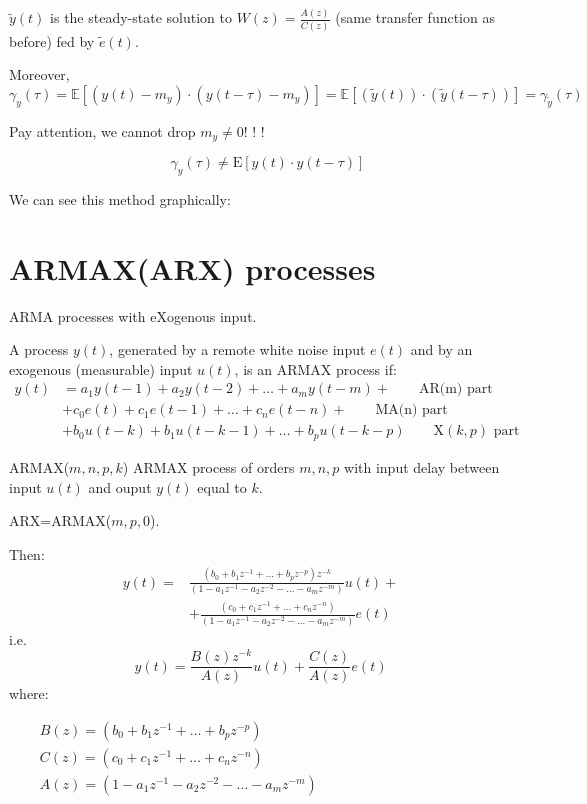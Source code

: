 $\tilde{y}(t)$ is the steady-state solution to $W(z)=\frac{A(z)}{C(z)}$ (same transfer function as before) fed by $\tilde{e}(t)$.

Moreover,
$$
\gamma_{y}(\tau)=\mathbb{E}\left[\left(y(t)-m_{y}\right) \cdot\left(y(t-\tau)-m_{y}\right)\right]=\mathbb{E}[(\tilde{y}(t)) \cdot(\tilde{y}(t-\tau))]=\gamma_{\tilde{y}}(\tau)
$$

Pay attention, we cannot drop $m_{y} \neq 0 $! ! ! 

$$\quad \gamma_{y}(\tau) \neq \mathrm{E}[y(t) \cdot y(t-\tau)]$$

We can see this method graphically:


\section{ARMAX(ARX) processes}
ARMA processes with eXogenous input.

A process $y(t)$, generated by a remote white noise input $e(t)$ and by an exogenous (measurable) input $u(t)$, is an ARMAX process if:
\begin{align*}
	y(t)&=a_{1} y(t-1)+a_{2} y(t-2)+\ldots+a_{m} y(t-m)+\quad\quad \text{AR(m) part}\\
	&+c_{0} e(t)+c_{1} e(t-1)+\ldots+c_{n} e(t-n)+\quad\quad \text{MA(n) part} \\
	&+b_{0} u(t-k)+b_{1} u(t-k-1)+\ldots+b_{p} u(t-k-p) \quad\quad \mathrm{X}(k, p) \text{ part}
\end{align*}

ARMAX($m,n,p,k$) ARMAX process of orders $m,n,p$ with input delay between input $u(t)$ and ouput $y(t)$ equal to $k$.

ARX=ARMAX($m,p,0$).

Then:
\begin{align*}
	y(t)=& \frac{\left(b_{0}+b_{1} z^{-1}+\ldots+b_{p} z^{-p}\right) z^{-k}}{\left(1-a_{1} z^{-1}-a_{2} z^{-2}-\ldots-a_{m} z^{-m}\right)} u(t)+\\
	&+\frac{\left(c_{0}+c_{1} z^{-1}+\ldots+c_{n} z^{-n}\right)}{\left(1-a_{1} z^{-1}-a_{2} z^{-2}-\ldots-a_{m} z^{-m}\right)} e(t)
\end{align*}
i.e.
$$
y(t)=\frac{B(z) z^{-k}}{A(z)} u(t)+\frac{C(z)}{A(z)} e(t)
$$
where:

 $\begin{array}{ll}\quad & B(z)=\left(b_{0}+b_{1} z^{-1}+\ldots+b_{p} z^{-p}\right) \\ & C(z)=\left(c_{0}+c_{1} z^{-1}+\ldots+c_{n} z^{-n}\right) \\ &A(z) =\left(1-a_{1} z^{-1}-a_{2} z^{-2}-\ldots-a_{m} z^{-m}\right)\end{array}$

